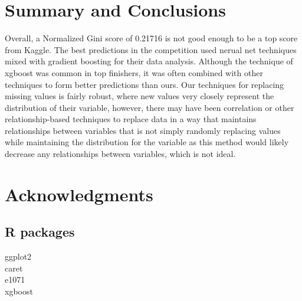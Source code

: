 \documentclass[fleqn,10pt]{SelfArx} %
\begin{document}
\bigskip
\bigskip
\section{Summary and Conclusions}
Overall, a Normalized Gini score of 0.21716 is not good enough to be a top score from Kaggle. The best predictions in the competition used nerual net techniques mixed with gradient boosting for their data analysis. Although the technique of xgboost was common in top finishers, it was often combined with other techniques to form better predictions than ours. Our techniques for replacing missing values is fairly robust, where new values very closely represent the distribution of their variable, however, there may have been correlation or other relationship-based techniques to replace data in a way that maintains relationships between variables that is not simply randomly replacing values while maintaining the distribution for the variable as this method would likely decrease any relationships between variables, which is not ideal.
\bigskip
\bigskip
\bigskip



\section*{Acknowledgments} %
\subsection{R packages}


ggplot2\\
caret\\
e1071\\
xgboost






\end{document}
